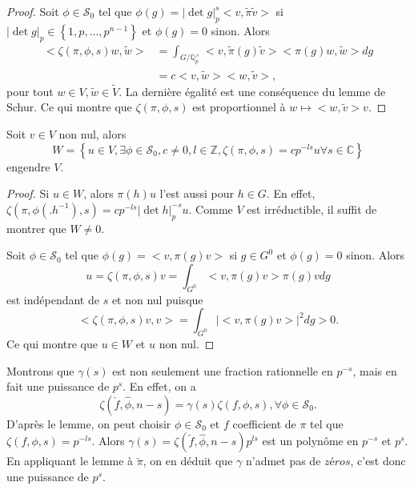 \begin{proof}
Soit $\phi \in \mathcal{S}_0$ tel que $\phi(g) = |\det g|_p^s<v, \tilde{\pi}\tilde{v}>$ si $|\det g|_p \in \left\lbrace 1, p, ..., p^{n-1} \right\rbrace$ et $\phi(g) = 0$ sinon. Alors
\begin{align}
<\zeta(\pi,\phi,s)w,\tilde{w}> &= \int_{G/\mathbb{Q}_p^\times} <v,\tilde{\pi}(g)\tilde{v}><\pi(g)w,\tilde{w}>dg \\
&= c <v, \tilde{w}><w,\tilde{v}>,
\end{align}
pour tout $w \in V, \tilde{w} \in \tilde{V}$. La dernière égalité est une conséquence du lemme de Schur. Ce qui montre que $\zeta(\pi, \phi,s)$ est proportionnel à $w \mapsto <w,\tilde{v}>v$.
\end{proof}

\begin{lemme}
Soit $v \in V$ non nul, alors
$$W=\left\lbrace u \in V, \exists \phi \in \mathcal{S}_0, c \neq 0, l \in \mathbb{Z}, \zeta(\pi, \phi, s) = cp^{-ls}u \forall s \in \mathbb{C} \right\rbrace$$
engendre $V$.
\end{lemme}

\begin{proof}
Si $u \in W$, alors $\pi(h)u$ l'est aussi pour $h \in G$. En effet,
$\zeta(\pi,\phi(.h^{-1}),s) = cp^{-ls}|\det h|_p^{-s}u$. Comme $V$ est irréductible, il suffit de montrer que $W \neq 0$.

Soit $\phi \in \mathcal{S}_0$ tel que $\phi(g) = <v, \pi(g)v>$ si $g \in G^0$ et $\phi(g) = 0$ sinon. Alors
\begin{equation}
u=\zeta(\pi, \phi, s)v = \int_{G^0} <v,\pi(g)v>\pi(g)v dg
\end{equation}
est indépendant de $s$ et non nul puisque
\begin{equation}
<\zeta(\pi,\phi,s)v,v> = \int_{G^0} |<v,\pi(g)v>|^2 dg > 0.
\end{equation}
Ce qui montre que $u \in W$ et $u$ non nul.
\end{proof}

Montrons que $\gamma(s)$ est non seulement une fraction rationnelle en $p^{-s}$, mais en fait une puissance de $p^s$. En effet, on a
\begin{equation}
\zeta(\check{f}, \hat{\phi}, n-s)=\gamma(s)\zeta(f,\phi,s), \forall \phi \in \mathcal{S}_0.
\end{equation}
D'après le lemme, on peut choisir $\phi \in \mathcal{S}_0$ et $f$ coefficient de $\pi$ tel que $\zeta(f,\phi,s)=p^{-ls}$. Alors $\gamma(s) = \zeta(\check{f}, \hat{\phi}, n-s)p^{ls}$ est un polynôme en $p^{-s}$ et $p^s$. En appliquant le lemme à $\check{\pi}$, on en déduit que $\gamma$ n'admet pas de $zéros$, c'est donc une puissance de $p^{s}$.

